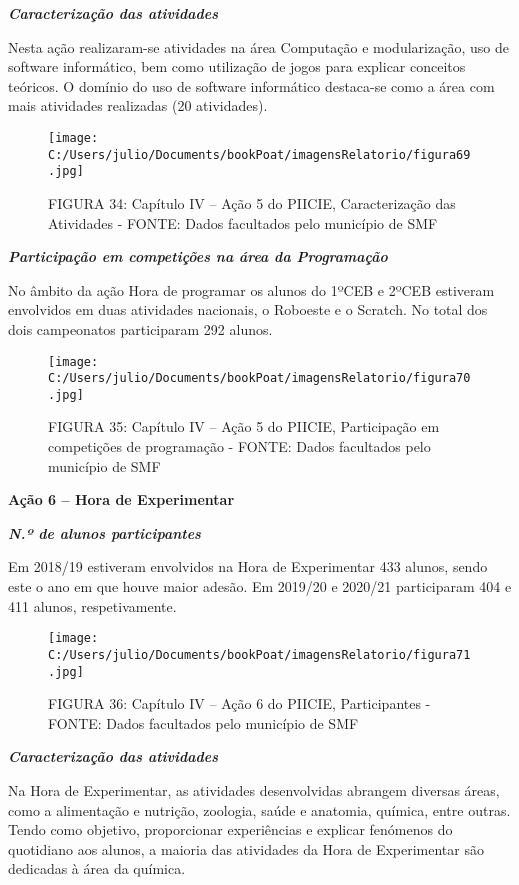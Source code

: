 \documentclass[
]{book}
\begin{document}
\textbf{\emph{Caracterização das atividades}}

Nesta ação realizaram-se atividades na área Computação e modularização, uso de software informático, bem como utilização de jogos para explicar conceitos teóricos. O domínio do uso de software informático destaca-se como a área com mais atividades realizadas (20 atividades).

\begin{figure}
\centering
\texttt{[image: C:/Users/julio/Documents/bookPoat/imagensRelatorio/figura69.jpg]}
\caption{FIGURA 34: Capítulo IV -- Ação 5 do PIICIE, Caracterização das Atividades - FONTE: Dados facultados pelo município de SMF}
\end{figure}

\textbf{\emph{Participação em competições na área da Programação}}

No âmbito da ação Hora de programar os alunos do 1ºCEB e 2ºCEB estiveram envolvidos em duas atividades nacionais, o Roboeste e o Scratch. No total dos dois campeonatos participaram 292 alunos.

\begin{figure}
\centering
\texttt{[image: C:/Users/julio/Documents/bookPoat/imagensRelatorio/figura70.jpg]}
\caption{FIGURA 35: Capítulo IV -- Ação 5 do PIICIE, Participação em competições de programação - FONTE: Dados facultados pelo município de SMF}
\end{figure}

\textbf{Ação 6 -- Hora de Experimentar}

\textbf{\emph{N.º de alunos participantes}}

Em 2018/19 estiveram envolvidos na Hora de Experimentar 433 alunos, sendo este o ano em que houve maior adesão. Em 2019/20 e 2020/21 participaram 404 e 411 alunos, respetivamente.

\begin{figure}
\centering
\texttt{[image: C:/Users/julio/Documents/bookPoat/imagensRelatorio/figura71.jpg]}
\caption{FIGURA 36: Capítulo IV -- Ação 6 do PIICIE, Participantes - FONTE: Dados facultados pelo município de SMF}
\end{figure}

\textbf{\emph{Caracterização das atividades}}

Na Hora de Experimentar, as atividades desenvolvidas abrangem diversas áreas, como a alimentação e nutrição, zoologia, saúde e anatomia, química, entre outras. Tendo como objetivo, proporcionar experiências e explicar fenómenos do quotidiano aos alunos, a maioria das atividades da Hora de Experimentar são dedicadas à área da química.
\end{document}
